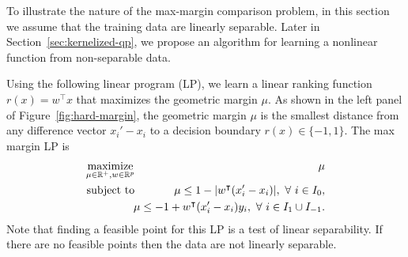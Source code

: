\documentclass{article}
\newcommand{\RR}{\mathbb R}
\DeclareMathOperator*{\maximize}{maximize}
\begin{document}
To illustrate the nature of the max-margin comparison problem, in this
section we assume that the training data are linearly separable. Later
in Section~\ref{sec:kernelized-qp}, we propose an algorithm for
learning a nonlinear function from non-separable data.

Using the following linear program (LP), we learn a linear ranking
function $r(x)=w^\intercal x$ that maximizes the geometric margin
$\mu$. As shown in the left panel of Figure~\ref{fig:hard-margin}, the
geometric margin $\mu$ is the smallest distance from any difference
vector $x_i'-x_i$ to a decision boundary $r(x)\in\{-1,1\}$. 
The
 max margin LP is
\begin{eqnarray}
  \label{eq:max-margin-lp}
  \maximize_{\mu\in\RR^+, w\in\RR^p}\ &&\hskip -0.5cm \mu \\
\nonumber
    \text{subject to}\ && \hskip -0.5cm \mu \leq 1-|w^\intercal (x_i' - x_i)|,\ 
    \forall\  i\in I_0,\\
\nonumber
    &&\hskip -0.5cm
\mu \leq -1 +  w^\intercal(x_i'-x_i)y_i,\ \forall\ i\in I_1\cup I_{-1}.
\end{eqnarray}
Note that finding a feasible point for this LP is a test of linear
separability. If there are no feasible points then the data are not
linearly separable. 
\end{document}
